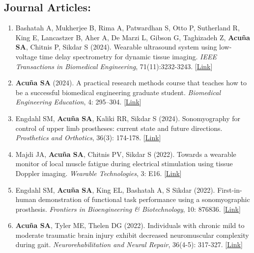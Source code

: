 \documentclass[letterpaper, 10pt]{article}
\begin{document}
\subsection{Journal Articles:}
\begin{enumerate}
    \item Bashatah A, Mukherjee B, Rima A, Patwardhan S, Otto P, Sutherland R, King E, Lancastzer B, Aher A, De Marzi L, Gibson G, Taghizadeh Z, \textbf{Acuña SA}, Chitnis P, Sikdar S (2024). Wearable ultrasound system using low-voltage time delay spectrometry for dynamic tissue imaging. \textit{IEEE Transactions in Biomedical Engineering}, 71(11):3232-3243. [\href{https://ieeexplore.ieee.org/document/10557691}{Link}] 
    \item \textbf{Acuña SA} (2024). A practical research methods course that teaches how to be a successful biomedical engineering graduate student. \textit{Biomedical Engineering Education}, 4: 295–304. [\href{https://link.springer.com/article/10.1007/s43683-024-00135-9}{Link}]
    \item Engdahl SM, \textbf{Acuña SA}, Kaliki RR, Sikdar S (2024). Sonomyography for control of upper limb prostheses: current state and future directions. \textit{Prosthetics and Orthotics}, 36(3): 174-178. [\href{https://journals.lww.com/jpojournal/fulltext/2024/07000/sonomyography_for_control_of_upper_limb.6.aspx}{Link}]
    \item Majdi JA, \textbf{Acuña SA}, Chitnis PV, Sikdar S (2022). Towards a wearable monitor of local muscle fatigue during electrical stimulation using tissue Doppler imaging. \textit{Wearable Technologies}, 3: E16. [\href{https://www.cambridge.org/core/journals/wearable-technologies/article/toward-a-wearable-monitor-of-local-muscle-fatigue-during-electrical-muscle-stimulation-using-tissue-doppler-imaging/4ADA49B3A98D245E222D5CCFDE1F180D}{Link}]
    \item Engdahl SM, \textbf{Acuña SA}, King EL, Bashatah A, S Sikdar (2022). First-in-human demonstration of functional task performance using a sonomyographic prosthesis. \textit{Frontiers in Bioengineering \& Biotechnology}, 10: 876836. [\href{https://www.frontiersin.org/articles/10.3389/fbioe.2022.876836/full}{Link}]
    \item \textbf{Acuña SA}, Tyler ME, Thelen DG (2022). Individuals with chronic mild to moderate traumatic brain injury exhibit decreased neuromuscular complexity during gait. \textit{Neurorehabilitation and Neural Repair}, 36(4-5): 317-327. [\href{https://journals.sagepub.com/doi/full/10.1177/15459683221081064}{Link}]

\end{enumerate}
\end{document}
